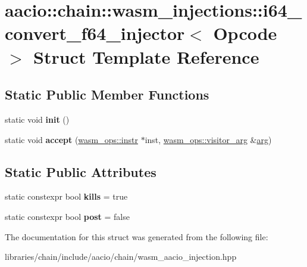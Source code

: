 \hypertarget{structaacio_1_1chain_1_1wasm__injections_1_1i64__convert__f64__injector}{}\section{aacio\+:\+:chain\+:\+:wasm\+\_\+injections\+:\+:i64\+\_\+convert\+\_\+f64\+\_\+injector$<$ Opcode $>$ Struct Template Reference}
\label{structaacio_1_1chain_1_1wasm__injections_1_1i64__convert__f64__injector}
\subsection*{Static Public Member Functions}
\begin{DoxyCompactItemize}
\item 
\mbox{\label{structaacio_1_1chain_1_1wasm__injections_1_1i64__convert__f64__injector_ae72cbf6d7483ece22763626d5565bbbb}} 
static void {\bfseries init} ()
\item 
\mbox{\label{structaacio_1_1chain_1_1wasm__injections_1_1i64__convert__f64__injector_a49653c47bc9a8d09a4a16db2e46c41af}} 
static void {\bfseries accept} (\mbox{\hyperlink{structaacio_1_1chain_1_1wasm__ops_1_1instr}{wasm\+\_\+ops\+::instr}} $\ast$inst, \mbox{\hyperlink{structaacio_1_1chain_1_1wasm__ops_1_1visitor__arg}{wasm\+\_\+ops\+::visitor\+\_\+arg}} \&\mbox{\hyperlink{unionarg}{arg}})
\end{DoxyCompactItemize}
\subsection*{Static Public Attributes}
\begin{DoxyCompactItemize}
\item 
\mbox{\label{structaacio_1_1chain_1_1wasm__injections_1_1i64__convert__f64__injector_af3ce3b23c9bf91f5b650ba092ffa939f}} 
static constexpr bool {\bfseries kills} = true
\item 
\mbox{\label{structaacio_1_1chain_1_1wasm__injections_1_1i64__convert__f64__injector_a4e605b018e7da4ed91f6cd37fb077c4d}} 
static constexpr bool {\bfseries post} = false
\end{DoxyCompactItemize}


The documentation for this struct was generated from the following file\+:\begin{DoxyCompactItemize}
\item 
libraries/chain/include/aacio/chain/wasm\+\_\+aacio\+\_\+injection.\+hpp\end{DoxyCompactItemize}
